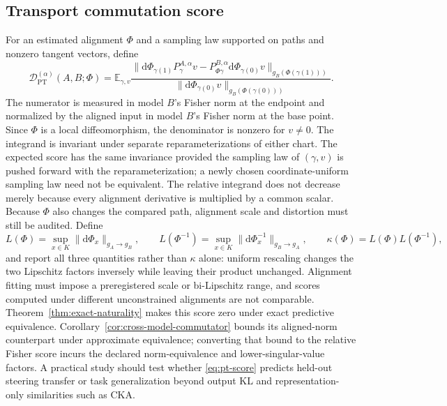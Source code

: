 \documentclass[11pt]{article}
\theoremstyle{definition}
\theoremstyle{remark}
\newcommand{\E}{\mathbb{E}}
\newcommand{\dd}{\mathrm{d}}
\begin{document}
\subsection{Transport commutation score}

For an estimated alignment $\Phi$ and a sampling law supported on paths and
nonzero tangent vectors, define
\begin{equation}
    \mathcal D_{\mathrm{PT}}^{(\alpha)}(A,B;\Phi)
    =\E_{\gamma,v}
    \frac{\|\dd\Phi_{\gamma(1)} P_\gamma^{A,\alpha}v
    -P_{\Phi\gamma}^{B,\alpha}\dd\Phi_{\gamma(0)} v\|_{g_B(\Phi(\gamma(1)))}}
    {\|\dd\Phi_{\gamma(0)}v\|_{g_B(\Phi(\gamma(0)))}}.
    \label{eq:pt-score}
\end{equation}
The numerator is measured in model $B$'s Fisher norm at the endpoint and normalized by the aligned input in model $B$'s Fisher norm at the base point. Since $\Phi$ is a local diffeomorphism, the denominator is nonzero for $v\ne0$. The integrand is invariant under separate reparameterizations of either chart. The expected score has the same invariance provided the sampling law of $(\gamma,v)$ is pushed forward with the reparameterization; a newly chosen coordinate-uniform sampling law need not be equivalent. The relative integrand does not decrease merely because every alignment derivative is multiplied by a common scalar. Because $\Phi$ also changes the compared path, alignment scale and distortion must still be audited. Define
\begin{equation}
    L(\Phi)=\sup_{x\in K}\|\dd\Phi_x\|_{g_A\to g_B},
    \qquad
    L(\Phi^{-1})=\sup_{x\in K}\|\dd\Phi_x^{-1}\|_{g_B\to g_A},
    \qquad
    \kappa(\Phi)
    =L(\Phi)L(\Phi^{-1}),
\end{equation}
and report all three quantities rather than $\kappa$ alone: uniform rescaling changes the two Lipschitz factors inversely while leaving their product unchanged. Alignment fitting must impose a preregistered scale or bi-Lipschitz range, and scores computed under different unconstrained alignments are not comparable. Theorem~\ref{thm:exact-naturality} makes this score zero under exact predictive equivalence. Corollary~\ref{cor:cross-model-commutator} bounds its aligned-norm counterpart under approximate equivalence; converting that bound to the relative Fisher score incurs the declared norm-equivalence and lower-singular-value factors. A practical study should test whether \eqref{eq:pt-score} predicts held-out steering transfer or task generalization beyond output KL and representation-only similarities such as CKA.
\end{document}
